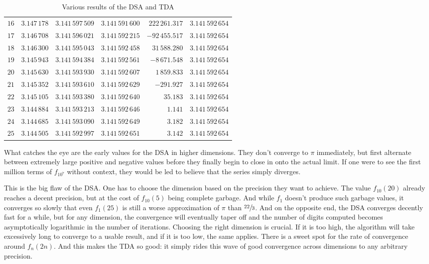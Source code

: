 \documentclass[a4paper,11pt]{scrartcl}
\theoremstyle{definition}
\theoremstyle{plain}
\theoremstyle{remark}
\newcommand{\truesfrac}[2]{{\displaystyle \sfrac{#1}{#2}}}
\begin{document}
\begin{table}[ht]
\begin{tabular}{r || r | r | r | r || r}
$16$ & $3.147\,178$ &  $3.141\,597\,509$ &   $3.141\,591\,600$ &     $222\,261.317$ & $3.141\,592\,654$ \\
$17$ & $3.146\,708$ &  $3.141\,596\,021$ &   $3.141\,592\,215$ &     $-92\,455.517$ & $3.141\,592\,654$ \\
$18$ & $3.146\,300$ &  $3.141\,595\,043$ &   $3.141\,592\,458$ &      $31\,588.280$ & $3.141\,592\,654$ \\
$19$ & $3.145\,943$ &  $3.141\,594\,384$ &   $3.141\,592\,561$ &      $-8\,671.548$ & $3.141\,592\,654$ \\
$20$ & $3.145\,630$ &  $3.141\,593\,930$ &   $3.141\,592\,607$ &       $1\,859.833$ & $3.141\,592\,654$ \\
$21$ & $3.145\,352$ &  $3.141\,593\,610$ &   $3.141\,592\,629$ &         $-291.927$ & $3.141\,592\,654$ \\
$22$ & $3.145\,105$ &  $3.141\,593\,380$ &   $3.141\,592\,640$ &           $35.183$ & $3.141\,592\,654$ \\
$23$ & $3.144\,884$ &  $3.141\,593\,213$ &   $3.141\,592\,646$ &            $1.141$ & $3.141\,592\,654$ \\
$24$ & $3.144\,685$ &  $3.141\,593\,090$ &   $3.141\,592\,649$ &            $3.182$ & $3.141\,592\,654$ \\
$25$ & $3.144\,505$ &  $3.141\,592\,997$ &   $3.141\,592\,651$ &            $3.142$ & $3.141\,592\,654$
\end{tabular}
\caption{Various results of the DSA and TDA}
\label{ResultsOfDsaAndTda}
\end{table}

What catches the eye are the early values for the DSA in higher dimensions.
They don't converge to $\pi$ immediately, but first alternate between extremely large positive and negative values before they finally begin to close in onto the actual limit.
If one were to see the first million terms of $f_{10^7}$ without context, they would be led to believe that the series simply diverges.

This is the big flaw of the DSA.
One has to choose the dimension based on the precision they want to achieve.
The value $f_{10}(20)$ already reaches a decent precision, but at the cost of $f_{10}(5)$ being complete garbage.
And while $f_1$ doesn't produce such garbage values, it converges so slowly that even $f_1(25)$ is still a worse approximation of $\pi$ than $\truesfrac{22}{3}$.
And on the opposite end, the DSA converges decently fast for a while, but for any dimension, the convergence will eventually taper off and the number of digits computed becomes asymptotically logarithmic in the number of iterations.
Choosing the right dimension is crucial.
If it is too high, the algorithm will take excessively long to converge to a usable result, and if it is too low, the same applies.
There is a sweet spot for the rate of convergence around $f_n(2n)$.
And this makes the TDA so good: it simply rides this wave of good convergence across dimensions to any arbitrary precision.
\end{document}
